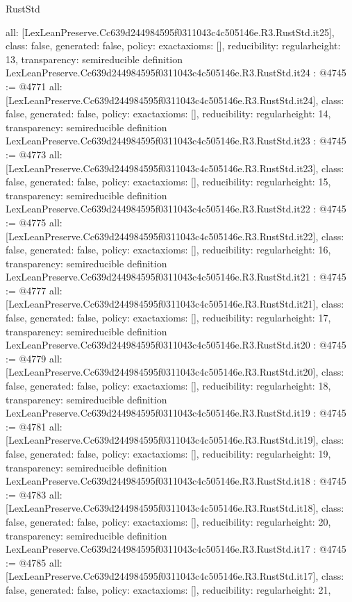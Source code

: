 \begin{lexlean}{RustStd}
\begin{coremodule}
{  all: [LexLeanPreserve.Cc639d244984595f0311043c4c505146e.R3.RustStd.it25],
  class: false,
  generated: false,
  policy: exact{axioms: []},
  reducibility: regular{height: 13},
  transparency: semireducible
}
definition LexLeanPreserve.Cc639d244984595f0311043c4c505146e.R3.RustStd.it24 : @4745 := @4771 {
  all: [LexLeanPreserve.Cc639d244984595f0311043c4c505146e.R3.RustStd.it24],
  class: false,
  generated: false,
  policy: exact{axioms: []},
  reducibility: regular{height: 14},
  transparency: semireducible
}
definition LexLeanPreserve.Cc639d244984595f0311043c4c505146e.R3.RustStd.it23 : @4745 := @4773 {
  all: [LexLeanPreserve.Cc639d244984595f0311043c4c505146e.R3.RustStd.it23],
  class: false,
  generated: false,
  policy: exact{axioms: []},
  reducibility: regular{height: 15},
  transparency: semireducible
}
definition LexLeanPreserve.Cc639d244984595f0311043c4c505146e.R3.RustStd.it22 : @4745 := @4775 {
  all: [LexLeanPreserve.Cc639d244984595f0311043c4c505146e.R3.RustStd.it22],
  class: false,
  generated: false,
  policy: exact{axioms: []},
  reducibility: regular{height: 16},
  transparency: semireducible
}
definition LexLeanPreserve.Cc639d244984595f0311043c4c505146e.R3.RustStd.it21 : @4745 := @4777 {
  all: [LexLeanPreserve.Cc639d244984595f0311043c4c505146e.R3.RustStd.it21],
  class: false,
  generated: false,
  policy: exact{axioms: []},
  reducibility: regular{height: 17},
  transparency: semireducible
}
definition LexLeanPreserve.Cc639d244984595f0311043c4c505146e.R3.RustStd.it20 : @4745 := @4779 {
  all: [LexLeanPreserve.Cc639d244984595f0311043c4c505146e.R3.RustStd.it20],
  class: false,
  generated: false,
  policy: exact{axioms: []},
  reducibility: regular{height: 18},
  transparency: semireducible
}
definition LexLeanPreserve.Cc639d244984595f0311043c4c505146e.R3.RustStd.it19 : @4745 := @4781 {
  all: [LexLeanPreserve.Cc639d244984595f0311043c4c505146e.R3.RustStd.it19],
  class: false,
  generated: false,
  policy: exact{axioms: []},
  reducibility: regular{height: 19},
  transparency: semireducible
}
definition LexLeanPreserve.Cc639d244984595f0311043c4c505146e.R3.RustStd.it18 : @4745 := @4783 {
  all: [LexLeanPreserve.Cc639d244984595f0311043c4c505146e.R3.RustStd.it18],
  class: false,
  generated: false,
  policy: exact{axioms: []},
  reducibility: regular{height: 20},
  transparency: semireducible
}
definition LexLeanPreserve.Cc639d244984595f0311043c4c505146e.R3.RustStd.it17 : @4745 := @4785 {
  all: [LexLeanPreserve.Cc639d244984595f0311043c4c505146e.R3.RustStd.it17],
  class: false,
  generated: false,
  policy: exact{axioms: []},
  reducibility: regular{height: 21},
}
\end{coremodule}
\end{lexlean}
